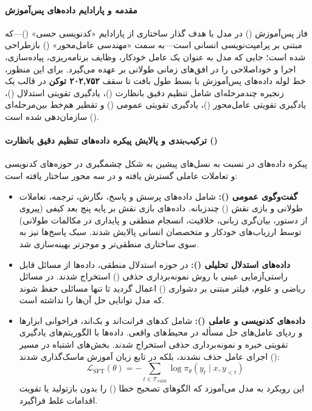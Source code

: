 \item {}

\paragraph*{مقدمه و پارادایم داده‌های پس‌آموزش}
فاز پس‌آموزش () در مدل  با هدف گذار ساختاری از پارادایم «کدنویسی حسی» ()—که مبتنی بر پرامپت‌نویسی انسانی است—به سمت «مهندسی عامل‌محور» () بازطراحی شده است؛ جایی که مدل به عنوان یک عامل خودکار، وظایف برنامه‌ریزی، پیاده‌سازی، اجرا و خوداصلاحی را در افق‌های زمانی طولانی بر عهده می‌گیرد. برای این منظور، خط لوله داده‌های پس‌آموزش با بسط طول بافت تا سقف \textbf{۲۰۲,۷۵۲ توکن} در قالب یک زنجیره چندمرحله‌ای شامل تنظیم دقیق با‌نظارت ()، یادگیری تقویتی استدلال ()، یادگیری تقویتی عامل‌محور ()، یادگیری تقویتی عمومی () و تقطیر هم‌خط بین‌مرحله‌ای () سازمان‌دهی شده است.

\paragraph*{ترکیب‌بندی و پالایش پیکره داده‌های تنظیم دقیق بانظارت ()}
پیکره داده‌های  در  نسبت به نسل‌های پیشین به شکل چشمگیری در حوزه‌های کدنویسی و تعاملات عاملی گسترش یافته و در سه محور ساختار یافته است:
\begin{itemize}
    \item \textbf{گفت‌وگوی عمومی ():} شامل داده‌های پرسش و پاسخ، نگارش، ترجمه، تعاملات طولانی و بازی نقش () چندزبانه. داده‌های بازی نقش بر پایه پنج بعد کیفی (پیروی از دستور، بیان‌گری زبانی، خلاقیت، انسجام منطقی و پایداری در مکالمات طولانی) توسط ارزیاب‌های خودکار و متخصصان انسانی پالایش شدند. سبک پاسخ‌ها نیز به سوی ساختاری منطقی‌تر و موجزتر بهینه‌سازی شد.
    \item \textbf{داده‌های استدلال تحلیلی ():} در حوزه استدلال منطقی، داده‌ها از مسائل قابل راستی‌آزمایی عینی با روش نمونه‌برداری حذفی () استخراج شدند. در مسائل ریاضی و علوم، فیلتر مبتنی بر دشواری () اعمال گردید تا تنها مسائلی حفظ شوند که مدل  توانایی حل آن‌ها را نداشته است.
    \item \textbf{داده‌های کدنویسی و عاملی ():} شامل کدهای فرانت‌اند و بک‌اند، فراخوانی ابزارها و ردپای عامل‌های حل مسأله در محیط‌های واقعی. داده‌ها با الگوریتم‌های یادگیری تقویتی خبره و نمونه‌برداری حذفی استخراج شدند. بخش‌های اشتباه در مسیر اجرای عامل حذف نشدند، بلکه در تابع زیان آموزش ماسک‌گذاری شدند ():
    \begin{equation}
        \mathcal{L}_{\text{SFT}}(\theta) = - \sum_{t \in \mathcal{T}_{\text{valid}}} \log \pi_\theta(y_t \mid x, y_{<t})
    \end{equation}
    این رویکرد به مدل می‌آموزد که الگوهای تصحیح خطا () را بدون بازتولید یا تقویت اقدامات غلط فراگیرد.
\end{itemize}

